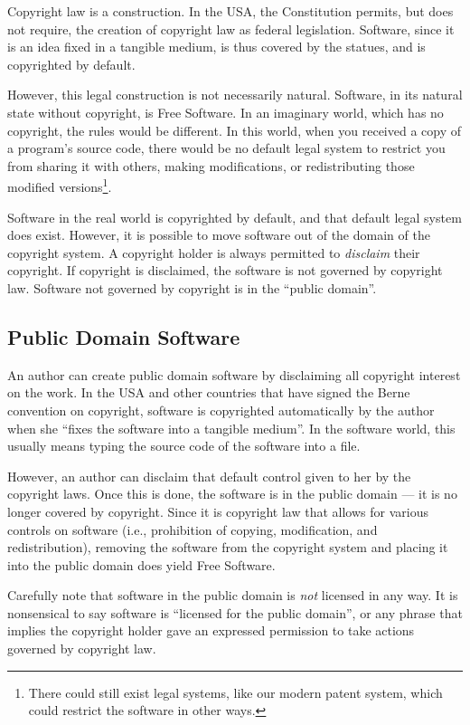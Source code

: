 \documentclass[12pt]{report}
\newcommand{\defn}[1]{\emph{#1}}
\begin{document}
Copyright law is a construction.  In the USA, the Constitution permits,
but does not require, the creation of copyright law as federal
legislation.  Software, since it is an idea fixed in a tangible medium, is
thus covered by the statues, and is copyrighted by default.

However, this legal construction is not necessarily natural.  Software, in
its natural state without copyright, is Free Software.  In an imaginary
world, which has no copyright, the rules would be different.  In this
world, when you received a copy of a program's source code, there would be
no default legal system to restrict you from sharing it with others,
making modifications, or redistributing those modified
versions\footnote{There could still exist legal systems, like our modern
  patent system, which could restrict the software in other ways.}.

Software in the real world is copyrighted by default, and that default
legal system does exist.  However, it is possible to move software out of
the domain of the copyright system.  A copyright holder is always
permitted to \defn{disclaim} their copyright.  If copyright is disclaimed,
the software is not governed by copyright law.  Software not governed by
copyright is in the ``public domain''.

\subsection{Public Domain Software}

An author can create public domain software by disclaiming all copyright
interest on the work.  In the USA and other countries that have signed the
Berne convention on copyright, software is copyrighted automatically by
the author when she ``fixes the software into a tangible medium''.  In
the software world, this usually means typing the source code of the
software into a file.

However, an author can disclaim that default control given to her by the
copyright laws.  Once this is done, the software is in the public domain
--- it is no longer covered by copyright.  Since it is copyright law that
allows for various controls on software (i.e., prohibition of copying,
modification, and redistribution), removing the software from the
copyright system and placing it into the public domain does yield Free
Software.

Carefully note that software in the public domain is \emph{not} licensed
in any way.  It is nonsensical to say software is ``licensed for the
public domain'', or any phrase that implies the copyright holder gave an
expressed permission to take actions governed by copyright law.
\end{document}
